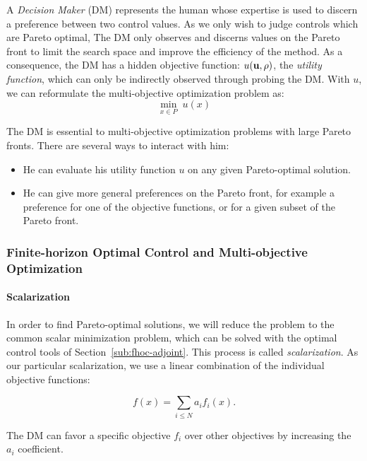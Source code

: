 			
			A \emph{Decision Maker} (DM) represents the human whose expertise is used to discern a preference between two control values. As we only wish to judge controls which are Pareto optimal, The DM only observes and discerns values on the Pareto front to limit the search space and improve the efficiency of the method. As a consequence, the DM has a hidden objective function: $u\left(\vectorize{u}, \vectorize{\rho}\right)$, the \emph{utility function}, which can only be indirectly observed through probing the DM. With $u$, we can reformulate the multi-objective optimization problem as:
			\begin{equation}\label{eq:multiobj_dm}
					\min_{x\in P} \;u(x)
			\end{equation}

			The DM is essential to multi-objective optimization problems with large Pareto fronts.  There are several ways to interact with him:
			\begin{itemize}
				\item He can evaluate his utility function $u$ on any given Pareto-optimal solution.
				\item He can give more general preferences on the Pareto front, for example a preference for one of the objective functions, or for a given subset of the Pareto front.
			\end{itemize}

			
		\subsubsection{Finite-horizon Optimal Control and Multi-objective Optimization}
			\paragraph{Scalarization}
In order to find Pareto-optimal solutions, we will reduce the problem to the common scalar minimization problem, which can be solved with the optimal control tools of Section~\ref{sub:fhoc-adjoint}. This process is called \emph{scalarization}. As our particular scalarization, we use a linear combination of the individual objective functions:

\begin{equation}
\label{eqn:linear-combo}
f(x) = \sum_{i \leq N} a_i f_i(x).
\end{equation}

The DM can favor a specific objective $f_i$ over other objectives by increasing the $a_i$ coefficient.

